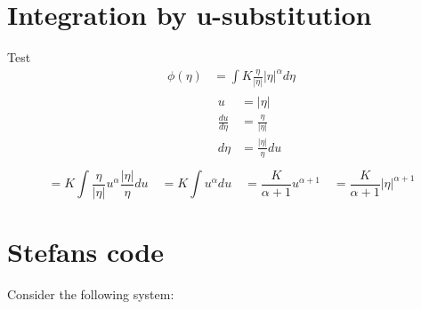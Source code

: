 \documentclass{article}
\begin{document}
\section{Integration by u-substitution}\label{app:integration}
Test
\begin{equation}
\begin{aligned}
    \phi(\eta) &= \int K\frac{\eta}{|\eta|}|\eta|^\alpha d\eta\\
    &\boxed{
    \begin{aligned}
    u &= |\eta| \\
    \frac{du}{d\eta} &= \frac{\eta}{|\eta|}\\
    d\eta &= \frac{|\eta|}{\eta}du
    \end{aligned}
    }\\
    \end{aligned}\nonumber
\end{equation}
    \begin{equation}
    = K\int \frac{\eta}{|\eta|}u^\alpha\frac{|\eta|}{\eta}du \quad = K\int u^\alpha du \quad = \frac{K}{\alpha + 1}u^{\alpha+1} \quad = \frac{K}{\alpha+1}|\eta|^{\alpha+1}
\end{equation}
\section{Stefans code}
Consider the following system:
\end{document}
